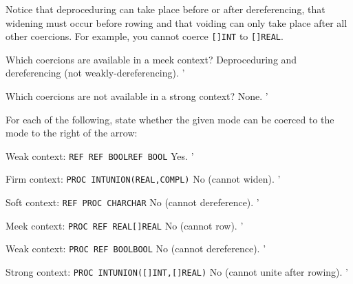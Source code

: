 Notice that deproceduring can take place before or after
dereferencing, that widening must occur before rowing and that
voiding can only take place after all other coercions. For example,
you cannot coerce \verb|[]INT| to \verb|[]REAL|.

\begin{exercise}
\item Which coercions are available in a meek context?
\ans Deproceduring and dereferencing (not weakly-deref\-eren\-cing).
'
\item Which coercions are not available in a strong context?
\ans None.
'
\item For each of the following, state whether the given mode can be
coerced to the mode to the right of the arrow:
\begin{subex}
\item Weak context: \verb|REF REF BOOL|\co\verb|REF BOOL| \subans Yes.
'
\item Firm context:\newline
\verb|PROC INT|\co\verb|UNION(REAL,COMPL)|
\subans No (cannot widen).
'
\item Soft context: \verb|REF PROC CHAR|\co\verb|CHAR| \subans No
(cannot dereference).
'
\item Meek context: \verb|PROC REF REAL|\co\verb|[]REAL| \subans No
(cannot row).
'
\item Weak context: \verb|PROC REF BOOL|\co\verb|BOOL| \subans No
(cannot dereference).
'
\item Strong context:\newline
\verb|PROC INT|\co\verb|UNION([]INT,[]REAL)|
\subans No (cannot unite after rowing).
'
\end{subex}
\end{exercise}

